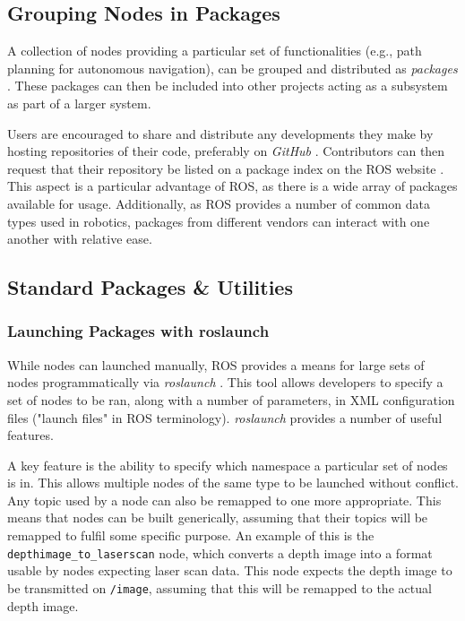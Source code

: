 \subsection{Grouping Nodes in Packages}
A collection of nodes providing a particular set of functionalities (e.g., path planning for autonomous navigation), can be grouped and distributed as \emph{packages} \cite{ros_paper}. These packages can then be included into other projects acting as a subsystem as part of a larger system.

Users are encouraged to share and distribute any developments they make by hosting repositories of their code, preferably on \emph{GitHub} \cite{ros_wiki_getinvolved}. Contributors can then request that their repository be listed on a package index on the ROS website \cite{ros_wiki_getinvolved}. This aspect is a particular advantage of ROS, as there is a wide array of packages available for usage. Additionally, as ROS provides a number of common data types used in robotics, packages from different vendors can interact with one another with relative ease.

\subsection{Standard Packages \& Utilities}
\subsubsection{Launching Packages with roslaunch}
While nodes can launched manually, ROS provides a means for large sets of nodes programmatically via \emph{roslaunch} \cite{ros_paper, ros_wiki_roslaunch}. This tool allows developers to specify a set of nodes to be ran, along with a number of parameters, in XML configuration files ("launch files" in ROS terminology). \emph{roslaunch} provides a number of useful features.

A key feature is the ability to specify which namespace a particular set of nodes is in. This allows multiple nodes of the same type to be launched without conflict. Any topic used by a node can also be remapped to one more appropriate. This means that nodes can be built generically, assuming that their topics will be remapped to fulfil some specific purpose. An example of this is the \texttt{depthimage\_to\_laserscan} node, which converts a depth image into a format usable by nodes expecting laser scan data. This node expects the depth image to be transmitted on \texttt{/image}, assuming that this will be remapped to the actual depth image.

